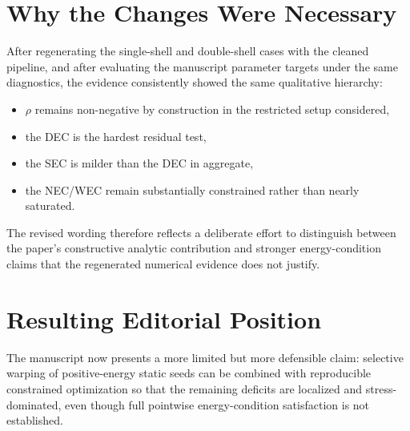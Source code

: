 \documentclass[11pt]{article}
\begin{document}
\section*{Why the Changes Were Necessary}
After regenerating the single-shell and double-shell cases with the cleaned pipeline, and after
evaluating the manuscript parameter targets under the same diagnostics, the evidence consistently
showed the same qualitative hierarchy:
\begin{itemize}
\item $\rho$ remains non-negative by construction in the restricted setup considered,
\item the DEC is the hardest residual test,
\item the SEC is milder than the DEC in aggregate,
\item the NEC/WEC remain substantially constrained rather than nearly saturated.
\end{itemize}

The revised wording therefore reflects a deliberate effort to distinguish between the paper's
constructive analytic contribution and stronger energy-condition claims that the regenerated
numerical evidence does not justify.

\section*{Resulting Editorial Position}
The manuscript now presents a more limited but more defensible claim: selective warping of
positive-energy static seeds can be combined with reproducible constrained optimization so that the
remaining deficits are localized and stress-dominated, even though full pointwise energy-condition
satisfaction is not established.
\end{document}

